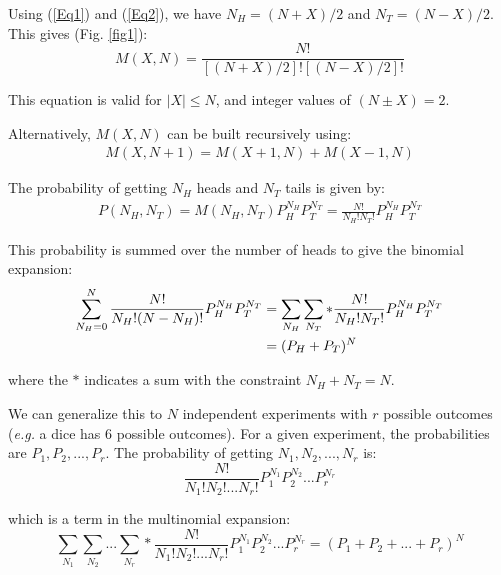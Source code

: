\documentclass[book.tex]{subfiles}
\begin{document}
Using (\ref{Eq1}) and (\ref{Eq2}), we have $N_H=(N+X)/2$ and $N_T=(N-X)/2$. This gives (Fig. \ref{fig1}): 
\begin{equation}\label{Eq4}
M(X,N)=\frac{N!}{[(N+X)/2]![(N-X)/2]!}
\end{equation}

This equation is valid for $|X| \leq N$, and integer values of $(N \pm X)=2$. 

Alternatively, $M(X,N)$ can be built recursively using:
\begin{align}\label{Eq5}
M(X,N+1)=M(X+1,N) + M(X-1,N)
\end{align}


The probability of getting $N_H$  heads and $N_T$ tails is given by:
\begin{align}\label{Eq6}
P(N_H,N_T)=M(N_H,N_T)P_H^{N_H}P_T^{N_T}=\frac{N!}{N_H!N_T!}P_H^{N_H}P_T^{N_T}
\end{align}

This probability is summed over the number of heads to give the binomial expansion:
\begin{align}\label{Eq7}
\sum_{N_H=0}^N \frac{N!}{N_H!(N-N_H)!}P_H^{N_H}P_T^{N_T}&=\sum_{N_H}\sum_{N_T}*\frac{N!}{N_H!N_T!}P_H^{N_H}P_T^{N_T}\notag\\ &=(P_H+P_T)^N
\end{align}

\noindent where the $*$ indicates a sum with the constraint $N_H+N_T=N$.

We can generalize this to $N$ independent experiments with $r$ possible outcomes (\textit{e.g.} a dice has 6 possible outcomes). For a given experiment, the probabilities are $P_1, P_2, . . . , P_r$. The probability of getting $N_1, N_2, . . . , N_r$ is:
\begin{equation}\label{Eq8}
\frac{N!}{N_1!N_2!...N_r!}P_1^{N_1}P_2^{N_2}...P_r^{N_r}
\end{equation}

\noindent which is a term in the multinomial expansion:
\begin{equation}\label{Eq9}
\sum_{N_1}\sum_{N_2}...\sum_{N_r}*\frac{N!}{N_1!N_2!...N_r!}P_1^{N_1}P_2^{N_2}...P_r^{N_r}=(P_1+P_2+...+P_r)^N
\end{equation}
\end{document}
